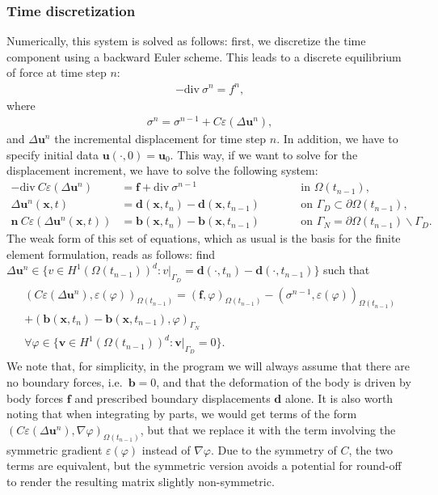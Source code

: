 \documentclass{article}
\renewcommand{\vec}[1]{\mathbf{#1}}
\renewcommand{\div}{\mathrm{div}\ }
\begin{document}
\subsubsection*{Time discretization}

Numerically, this system is solved as follows: first, we discretize
the time component using a backward Euler scheme. This leads to a
discrete equilibrium of force at time step $n$:
\begin{gather}
  -\div \sigma^n = f^n,
\end{gather}
where
\begin{gather}
  \sigma^n = \sigma^{n-1} + C \varepsilon (\Delta \vec u^n),
\end{gather}
and $\Delta \vec u^n$ the incremental displacement for time step
$n$. In addition, we have to specify initial data $\vec u(\cdot,0)=\vec u_0$. 
This way, if we want to solve for the displacement increment, we
have to solve the following system:
\begin{align}
  - \div  C \varepsilon(\Delta\vec u^n) &= \vec f + \div \sigma^{n-1}
  &&\text{in $\Omega(t_{n-1})$},
  \\
  \Delta \vec u^n(\vec x,t) &= \vec d(\vec x,t_n) - \vec d(\vec x,t_{n-1})
  \qquad
  &&\text{on $\Gamma_D\subset\partial\Omega(t_{n-1})$},
  \\
  \vec n \ C \varepsilon(\Delta \vec u^n(\vec x,t)) &= \vec b(\vec x,t_n)-\vec b(\vec x,t_{n-1})
  \qquad
  &&\text{on $\Gamma_N=\partial\Omega(t_{n-1})\backslash\Gamma_D$}.
\end{align}
The weak form of this set of equations, which as usual is the basis for the
finite element formulation, reads as follows: find $\Delta \vec u^n \in
\{v\in H^1(\Omega(t_{n-1}))^d: v|_{\Gamma_D}=\vec d(\cdot,t_n) - \vec d(\cdot,t_{n-1})\}$
such that
\begin{gather}
  \begin{split}
  \label{eq:linear-system}
  (C \varepsilon(\Delta\vec u^n), \varepsilon(\varphi) )_{\Omega(t_{n-1})}
  = 
  (\vec f, \varphi)_{\Omega(t_{n-1})}
  -(\sigma^{n-1},\varepsilon(\varphi))_{\Omega(t_{n-1})}
  \\
  +(\vec b(\vec x,t_n)-\vec b(\vec x,t_{n-1}), \varphi)_{\Gamma_N}
  \\
  \forall \varphi \in \{\vec v\in H^1(\Omega(t_{n-1}))^d: \vec
  v|_{\Gamma_D}=0\}.     
  \end{split}
\end{gather}
We note that, for simplicity, in the program we will always assume that there
are no boundary forces, i.e.~$\vec b = 0$, and that the deformation of the
body is driven by body forces $\vec f$ and prescribed boundary displacements
$\vec d$ alone. It is also worth noting that when integrating by parts, we
would get terms of the form $(C \varepsilon(\Delta\vec u^n), \nabla \varphi
)_{\Omega(t_{n-1})}$, but that we replace it with the term involving the
symmetric gradient $\varepsilon(\varphi)$ instead of $\nabla\varphi$. Due to
the symmetry of $C$, the two terms are equivalent, but the symmetric version
avoids a potential for round-off to render the resulting matrix slightly
non-symmetric.
\end{document}
